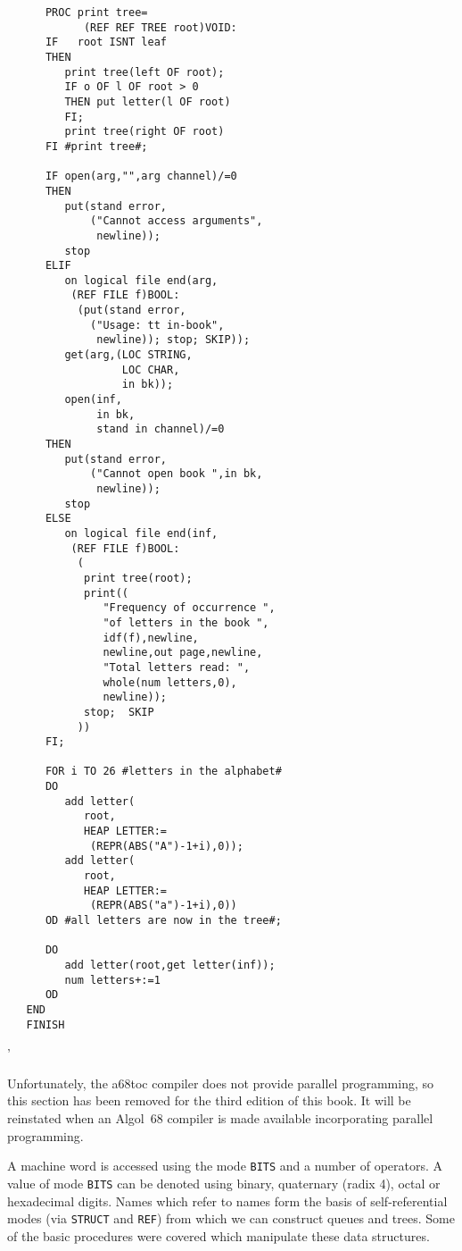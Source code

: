 \begin{exercise}
\begin{verbatim}
      PROC print tree=
            (REF REF TREE root)VOID:
      IF   root ISNT leaf
      THEN
         print tree(left OF root);
         IF o OF l OF root > 0
         THEN put letter(l OF root)
         FI;
         print tree(right OF root)
      FI #print tree#;

      IF open(arg,"",arg channel)/=0
      THEN
         put(stand error,
             ("Cannot access arguments",
              newline));
         stop
      ELIF
         on logical file end(arg,
          (REF FILE f)BOOL:
           (put(stand error,
             ("Usage: tt in-book",
              newline)); stop; SKIP));
         get(arg,(LOC STRING,
                  LOC CHAR,
                  in bk));
         open(inf,
              in bk,
              stand in channel)/=0
      THEN
         put(stand error,
             ("Cannot open book ",in bk,
              newline));
         stop
      ELSE
         on logical file end(inf,
          (REF FILE f)BOOL:
           (
            print tree(root);
            print((
               "Frequency of occurrence ",
               "of letters in the book ",
               idf(f),newline,
               newline,out page,newline,
               "Total letters read: ",
               whole(num letters,0),
               newline));
            stop;  SKIP
           ))
      FI;

      FOR i TO 26 #letters in the alphabet#
      DO
         add letter(
            root,
            HEAP LETTER:=
             (REPR(ABS("A")-1+i),0));
         add letter(
            root,
            HEAP LETTER:=
             (REPR(ABS("a")-1+i),0))
      OD #all letters are now in the tree#;

      DO
         add letter(root,get letter(inf));
         num letters+:=1
      OD
   END
   FINISH
\end{verbatim}
'
\end{exercise}

Unfortunately, the a68toc compiler does not provide parallel
programming, so this section has been removed for the third edition of
this book. It will be reinstated when an Algol~68 compiler is made
available incorporating parallel programming.
\newpage

A machine word is accessed using the mode \verb|BITS| and a number of
operators. A value of mode \verb|BITS| can be denoted using binary,
quaternary (radix 4), octal or hexadecimal digits.  Names which refer
to names form the basis of self-referential modes (via \verb|STRUCT|
and \verb|REF|) from which we can construct queues and trees.  Some of
the basic procedures were covered which manipulate these data
structures.
